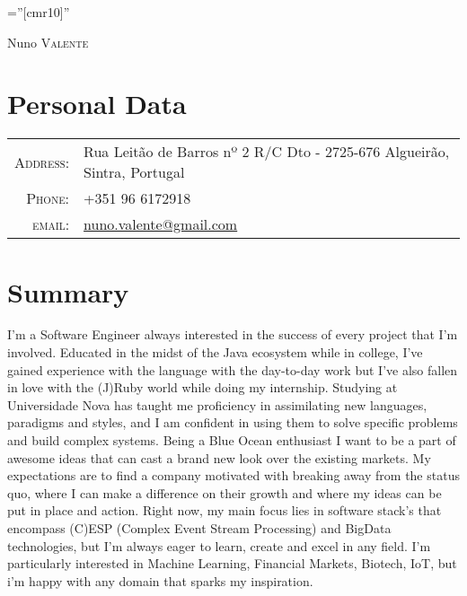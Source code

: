 \documentclass[a4paper,10pt]{article}
\begin{document}
\pagestyle{empty} %

\font\fb=''[cmr10]'' %

\par{\centering
  {\Huge Nuno \textsc{Valente}
}\bigskip\par}

\section{Personal Data}
\begin{tabular}{rl}
    \textsc{Address:}   & Rua Leitão de Barros nº 2 R/C Dto - 2725-676 Algueirão, Sintra, Portugal\\
    \textsc{Phone:}     & +351 96 6172918\\
    \textsc{email:}     & \href{mailto:nuno.valente@gmail.com}{nuno.valente@gmail.com} \\
\end{tabular}

\section{Summary}
I'm a Software Engineer always interested in the success of every project that I'm involved.
Educated in the midst of the Java ecosystem while in college, I've gained experience with the language with the day-to-day work but I've also fallen in love with the (J)Ruby world while doing my internship.
Studying at Universidade Nova has taught me proficiency in assimilating new languages, paradigms and styles, and I am confident in using them to solve specific problems and build complex systems.
Being a Blue Ocean enthusiast I want to be a part of awesome ideas that can cast a brand new look over the existing markets.
My expectations are to find a company motivated with breaking away from the status quo, where I can make a difference on their growth and where my ideas can be put in place and action.
Right now, my main focus lies in software stack's that encompass (C)ESP (Complex Event Stream Processing) and BigData technologies, but I’m always eager to learn, create and excel in any field. 
I'm particularly interested in Machine Learning, Financial Markets, Biotech, IoT, but i'm happy with any domain that sparks my inspiration.

\end{document}
